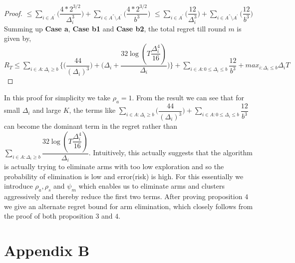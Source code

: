 \begin{proof}
\newline
\hspace*{0em}$\leq\sum_{i\in A^{'}}\bigg(\dfrac{4*2^{3/2}}{\Delta_{i}^{3}} \bigg)+\sum_{i\in A^{''}\setminus A^{'}}\bigg(\dfrac{4*2^{3/2}}{b^{3}} \bigg)$
\newline
\hspace*{0em}$\leq\sum_{i\in A^{'}}\bigg(\dfrac{12}{\Delta_{i}^{3}} \bigg)+\sum_{i\in A^{''}\setminus A^{'}}\bigg(\dfrac{12}{b^{3}} \bigg)$
\newline
Summing up \textbf{Case a}, \textbf{Case b1} and \textbf{Case b2}, the total regret till round $m$ is given by,
\newline $R_{T}\leq \sum_{i\in A:\Delta_{i}\geq b}\bigg \lbrace \bigg(\dfrac{44}{(\Delta_{i})^{3}}\bigg) + \bigg(\Delta_{i}+\dfrac{32\log{(T\dfrac{\Delta_{i}^{4}}{16})}}{\Delta_{i}}\bigg)\bigg\rbrace + \sum_{i\in A:0\leq\Delta_{i}\leq b}\dfrac{12}{b^{3}} + max_{i:\Delta_{i}\leq b}\Delta_{i}T$
\end{proof}

\begin{remark}
\label{App:A:Rem:1}
In this proof for simplicity we take $\rho_{a}=1$. From the result we can see that for small $\Delta_{i}$ and large $K$, the terms like $ \sum_{i\in A:\Delta_{i}\geq b}\bigg(\dfrac{44}{(\Delta_{i})^{3}}\bigg) + \sum_{i\in A:0\leq\Delta_{i}\leq b}\dfrac{12}{b^{3}}$ can become the dominant term in the regret rather than $\sum_{i\in A:\Delta_{i}\geq b}\dfrac{32\log{(T\dfrac{\Delta_{i}^{4}}{16})}}{\Delta_{i}}$. Intuitively, this actually suggests that the algorithm is actually trying to eliminate arms with too low exploration and so the probability of elimination is low and error(risk) is high. For this essentially we introduce $\rho_{a},\rho_{s}$ and $\psi_{m}$ which enables us to eliminate arms and clusters aggressively and thereby reduce the first two terms. After proving proposition $4$ we give an alternate regret bound for arm elimination, which closely follows from the proof of both proposition $3$ and $4$.  
\end{remark}

\section{Appendix B}

